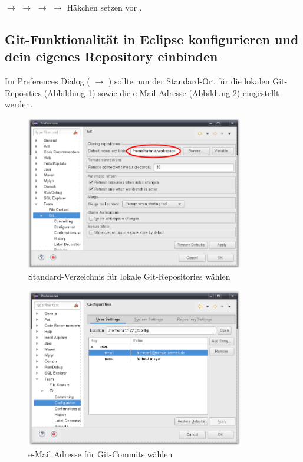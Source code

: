  $\rightarrow$  $\rightarrow$
 $\rightarrow$  $\rightarrow$
Häkchen setzen vor .

\subsection{Git-Funktionalität in Eclipse konfigurieren und dein eigenes
Repository einbinden}

Im Preferences Dialog ( $\rightarrow$ ) sollte
nun der Standard-Ort für die lokalen Git-Reposities (Abbildung
\ref{fig:eclipse-git-configuration-1}) sowie die e-Mail Adresse (Abbildung
\ref{fig:eclipse-git-configuration-2}) eingestellt
werden.

\begin{figure}[h]
  \centering
   \includegraphics[width=0.85\textwidth]{./inf/SEKII/01_Vorbereitung/Eclipse-Git-Configuration-1.png}
   \caption{Standard-Verzeichnis für lokale Git-Repositories wählen}
   \label{fig:eclipse-git-configuration-1}
\end{figure}

\begin{figure}[h]
  \centering
   \includegraphics[width=0.85\textwidth]{./inf/SEKII/01_Vorbereitung/Eclipse-Git-Configuration-2.png}
   \caption{e-Mail Adresse für Git-Commits wählen}
   \label{fig:eclipse-git-configuration-2}
\end{figure}

